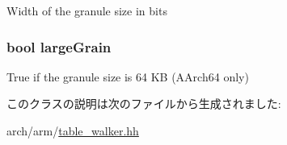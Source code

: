 \label{classArmISA_1_1TableWalker_1_1LongDescriptor_a887606cb7c0d8e19afb1a67ac7293519}
Width of the granule size in bits \hypertarget{classArmISA_1_1TableWalker_1_1LongDescriptor_a0147ae2ff00e021ff30ba60e73de3e09}{
\subsubsection[{largeGrain}]{\setlength{\rightskip}{0pt plus 5cm}bool {\bf largeGrain}}}
\label{classArmISA_1_1TableWalker_1_1LongDescriptor_a0147ae2ff00e021ff30ba60e73de3e09}
True if the granule size is 64 KB (AArch64 only) 

このクラスの説明は次のファイルから生成されました:\begin{DoxyCompactItemize}
\item 
arch/arm/\hyperlink{table__walker_8hh}{table\_\-walker.hh}\end{DoxyCompactItemize}
